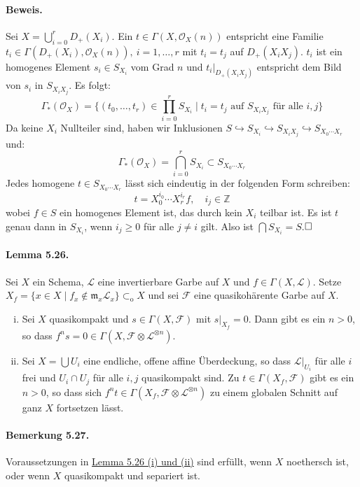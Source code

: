 \documentclass[11pt,b5paper,openany]{memoir}
\def \qed {$\hfill\square$}
\begin{document}
\paragraph{Beweis.} Sei $X=\bigcup_{i=0}^r D_+(X_i)$. Ein $t\in\Gamma(X,\mathcal{O}_X(n))$ entspricht eine Familie $t_i\in\Gamma(D_+(X_i),\mathcal{O}_X(n)),\ i=1,\ldots,r$ mit $t_i=t_j$ auf $D_+(X_iX_j)$. $t_i$ ist ein homogenes Element $s_i\in S_{X_i}$ vom Grad $n$ und $t_i|_{D_+(X_iX_j)}$ entspricht dem Bild von $s_i$ in $S_{X_iX_j}$. Es folgt:
\[\Gamma_\ast(\mathcal{O}_X)=\Big\{ (t_0,\ldots,t_r)\in\prod_{i=0}^r S_{X_i}\mid t_i=t_j\text{ auf } S_{X_iX_j}\text{ für alle }i,j \Big\} \]
Da keine $X_i$ Nullteiler sind, haben wir Inklusionen $S\hookrightarrow S_{X_i}\hookrightarrow S_{X_iX_j}\hookrightarrow S_{X_0\cdots X_r}$ und:
\[\Gamma_\ast(\mathcal{O}_X)=\bigcap_{i=0}^r S_{X_i}\subset S_{X_0\cdots X_r} \]
Jedes homogene $t\in S_{X_0\cdots X_r}$ lässt sich eindeutig in der folgenden Form schreiben:
\[t=X_0^{i_0}\cdots X_r^{i_r}f,\quad i_j\in\mathbb{Z}\]
wobei $f\in S$ ein homogenes Element ist, das durch kein $X_i$ teilbar ist. Es ist $t$ genau dann in $S_{X_i}$, wenn $i_j\geq 0$ für alle $j\neq i$ gilt. Also ist $\bigcap S_{X_i}=S$.\qed

\paragraph{Lemma 5.26.}\label{5.26} Sei $X$ ein Schema, $\mathcal{L}$ eine invertierbare Garbe auf $X$ und $f\in\Gamma(X,\mathcal{L})$. Setze $X_f=\{x\in X\mid f_x\not\in\mathfrak{m}_x\mathcal{L}_x\}\subset_\text{o}X$ und sei $\mathcal{F}$ eine quasikohärente Garbe auf $X$.
\begin{enumerate}[(i)]
\item Sei $X$ quasikompakt und $s\in\Gamma(X,\mathcal{F})$ mit $s|_{X_f}=0$. Dann gibt es ein $n>0$, so dass $f^ns=0\in\Gamma(X,\mathcal{F}\otimes\mathcal{L}^{\otimes n})$.
\item Sei $X=\bigcup U_i$ eine endliche, offene affine Überdeckung, so dass $\mathcal{L}|_{U_i}$ für alle $i$ frei und $U_i\cap U_j$ für alle $i,j$ quasikompakt sind. Zu $t\in\Gamma(X_f,\mathcal{F})$ gibt es ein $n>0$, so dass sich $f^nt\in\Gamma(X_f,\mathcal{F}\otimes\mathcal{L}^{\otimes n})$ zu einem globalen Schnitt auf ganz $X$ fortsetzen lässt.
\end{enumerate}

\paragraph{Bemerkung 5.27.}\label{5.27} Voraussetzungen in \hyperref[5.26]{Lemma 5.26 (i) und (ii)} sind erfüllt, wenn $X$ noethersch ist, oder wenn $X$ quasikompakt und separiert ist.
\end{document}
